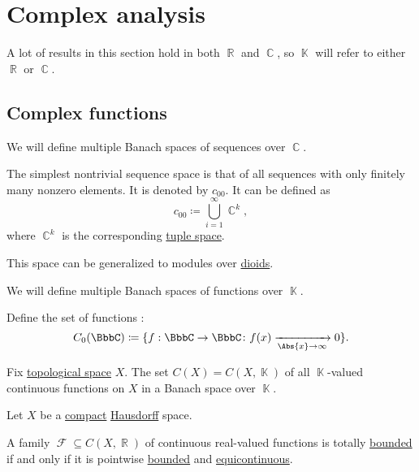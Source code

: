 \section{Complex analysis}\label{sec:complex_analysis}

A lot of results in this section hold in both \( \BbbR \) and \( \BbbC \), so \( \BbbK \) will refer to either \( \BbbR \) or \( \BbbC \).

\subsection{Complex functions}\label{subsec:complex_functions}

\begin{definition}\label{def:sequence_spaces}
  We will define multiple Banach spaces of sequences over \( \BbbC \).

  \begin{DefEnum}
     The simplest nontrivial sequence space is that of all sequences with only finitely many nonzero elements. It is denoted by \( c_{00} \). It can be defined as
    \begin{equation*}
      c_{00} \coloneqq \bigcup_{i=1}^\infty \BbbC^k,
    \end{equation*}
    where \( \BbbC^k \) is the corresponding \hyperref[def:left_module_of_tuples]{tuple space}.

    This space can be generalized to modules over \hyperref[def:left_module]{dioids}.
  \end{DefEnum}
\end{definition}

\begin{definition}\label{def:function_spaces}
  We will define multiple Banach spaces of functions over \( \BbbK \).

  \begin{DefEnum}
     Define the set of functions :
    \begin{equation*}
      C_0(\BbbC) \coloneqq \{ f: \BbbC \to \BbbC \colon f(x) \xrightarrow[\Abs{x} \to \infty]{} 0 \}.
    \end{equation*}

     Fix \hyperref[def:topological_space]{topological space} \( X \). The set \( C(X) = C(X, \BbbK) \) of all \( \BbbK \)-valued continuous functions on \( X \) in a Banach space over \( \BbbK \).
  \end{DefEnum}
\end{definition}

\begin{theorem}\label{thm:arzela_ascoli}
  Let \( X \) be a \hyperref[def:compact_space]{compact} \hyperref[def:separation_axioms/T2]{Hausdorff} space.

  A family \( \mscrF \subseteq C(X, \BbbR) \) of continuous real-valued functions is totally \hyperref[def:totally_bounded_set]{bounded} if and only if it is pointwise \hyperref[def:bounded_function/pointwise]{bounded} and \hyperref[def:function_set_continuity/equicontinuous]{equicontinuous}.
\end{theorem}
